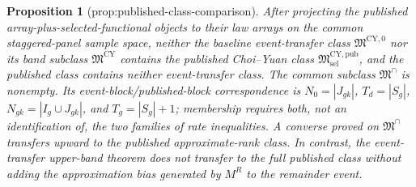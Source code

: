 \documentclass{article}
\newtheorem{proposition}{Proposition}
\begin{document}
\begin{proposition}[prop:published-class-comparison]\label{prop:published-class-comparison}
After projecting the published array-plus-selected-functional objects to
their law arrays on the common staggered-panel sample space, neither the
baseline event-transfer class \(\mathfrak M^{\mathrm{CY},0}\) nor its band
subclass \(\mathfrak M^{\mathrm{CY}}\) contains the published Choi--Yuan
class \(\mathfrak M^{\mathrm{CY,pub}}_{\mathrm{sel}}\), and the published
class contains neither event-transfer class.  The common subclass
\(\mathfrak M^\cap\) is nonempty.  Its event-block/published-block
correspondence is
\(N_0=|J_{gk}|\), \(T_d=|S_g|\),
\(N_{gk}=|I_g\cup J_{gk}|\), and \(T_g=|S_g|+1\); membership requires
both, not an identification of, the two families of rate inequalities.
A converse proved on \(\mathfrak M^\cap\) transfers upward to the
published approximate-rank class.  In contrast, the event-transfer
upper-band theorem does not transfer to the full published class without
adding the approximation bias generated by \(M^R\) to the remainder
event.
\end{proposition}
\end{document}
